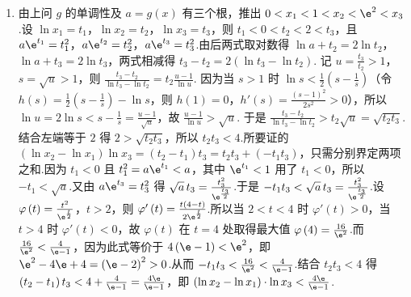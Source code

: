 \begin{solution}
\begin{enumerate}
\begin{enumerate}
\item 由上问 \(g\) 的单调性及 \(a=g\left(x\right)\) 有三个根，推出 \(0<x_1<1<x_2<\e^2<x_3\).设 \(\ln x_1=t_1\)，\(\ln x_2=t_2\)，\(\ln x_3=t_3\)，则 \(t_1<0<t_2<2<t_3\)，且 \(a\e^{t_1}=t_1^2\)，\(a\e^{t_2}=t_2^2\)，\(a\e^{t_3}=t_3^2\).由后两式取对数得 \(\ln a+t_2=2\ln t_2\)，\(\ln a+t_3=2\ln t_3\)，两式相减得 \(t_3-t_2=2\left(\ln t_3-\ln t_2\right)\). 记 \(u=\frac{t_3}{t_2}>1\)，\(s=\sqrt{u}>1\)，则 \(\frac{t_3-t_2}{\ln t_3-\ln t_2}=t_2\frac{u-1}{\ln u}\). 因为当 \(s>1\) 时 \(\ln s<\frac12\left(s-\frac1s\right)\)（令 \(h\left(s\right)=\frac12\left(s-\frac1s\right)-\ln s\)，则 \(h\left(1\right)=0\)，\(h'\left(s\right)=\frac{\left(s-1\right)^2}{2s^2}>0\)），所以 \(\ln u=2\ln s<s-\frac1s=\frac{u-1}{\sqrt{u}}\)，故 \(\frac{u-1}{\ln u}>\sqrt{u}\). 于是 \(\frac{t_3-t_2}{\ln t_3-\ln t_2}>t_2\sqrt{u}=\sqrt{t_2t_3}\). 结合左端等于 \(2\) 得 \(2>\sqrt{t_2t_3}\)，所以 \(t_2t_3<4\).所要证的 \(\left(\ln x_2-\ln x_1\right)\ln x_3=\left(t_2-t_1\right)t_3=t_2t_3+\left(-t_1t_3\right)\)，只需分别界定两项之和.因为 \(t_1<0\) 且 \(t_1^2=a\e^{t_1}<a\)，其中 \(\e^{t_1}<1\) 用了 \(t_1<0\)，所以 \(-t_1<\sqrt{a}\).又由 \(a\e^{t_3}=t_3^2\) 得 \(\sqrt{a}\,t_3=\frac{t_3^2}{\e^{\frac{t_3}{2}}}\).于是 \(-t_1t_3<\sqrt{a}\,t_3=\frac{t_3^2}{\e^{\frac{t_3}{2}}}\).设 \(\varphi\left(t\right)=\frac{t^2}{\e^{\frac{t}{2}}}\)，\(t>2\)，则 \(\varphi'\left(t\right)=\frac{t\left(4-t\right)}{2\e^{\frac{t}{2}}}\).所以当 \(2<t<4\) 时 \(\varphi'\left(t\right)>0\)，当 \(t>4\) 时 \(\varphi'\left(t\right)<0\)，故 \(\varphi\left(t\right)\) 在 \(t=4\) 处取得最大值 \(\varphi\left(4\right)=\frac{16}{\e^2}\).而 \(\frac{16}{\e^2}<\frac{4}{\e-1}\)，因为此式等价于 \(4\left(\e-1\right)<\e^2\)，即 \(\e^2-4\e+4=\left(\e-2\right)^2>0\).从而 \(-t_1t_3<\frac{16}{\e^2}<\frac{4}{\e-1}\).结合 \(t_2t_3<4\) 得 \(\left(t_2-t_1\right)t_3<4+\frac{4}{\e-1}=\frac{4\e}{\e-1}\)，即 \(\left(\ln x_2-\ln x_1\right)\cdot\ln x_3<\frac{4\e}{\e-1}\).
\end{enumerate}
\end{enumerate}
\end{solution}
